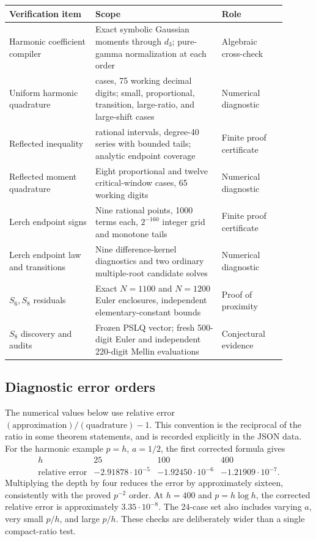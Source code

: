 \begin{center}
\small
\begin{tabular}{>{\raggedright\arraybackslash}p{0.28\linewidth}>{\raggedright\arraybackslash}p{0.41\linewidth}>{\raggedright\arraybackslash}p{0.21\linewidth}}
\toprule
Verification item & Scope & Role\\
\midrule
Harmonic coefficient compiler &
Exact symbolic Gaussian moments through $d_3$; pure-gamma
normalization at each order &
Algebraic cross-check\\[0.35em]
Uniform harmonic quadrature &
24 cases, 75 working decimal digits; small, proportional,
transition, large-ratio, and large-shift cases &
Numerical diagnostic\\[0.35em]
Reflected inequality &
112 rational intervals, degree-40 series with bounded tails;
analytic endpoint coverage &
Finite proof certificate\\[0.35em]
Reflected moment quadrature &
Eight proportional and twelve critical-window cases,
65 working digits &
Numerical diagnostic\\[0.35em]
Lerch endpoint signs &
Nine rational points, 1000 terms each, $2^{-160}$ integer grid
and monotone tails &
Finite proof certificate\\[0.35em]
Lerch endpoint law and transitions &
Nine difference-kernel diagnostics and two ordinary
multiple-root candidate solves &
Numerical diagnostic\\[0.35em]
$S_6,S_8$ residuals &
Exact $N=1100$ and $N=1200$ Euler enclosures,
independent elementary-constant bounds &
Proof of proximity\\[0.35em]
$S_8$ discovery and audits &
Frozen PSLQ vector; fresh 500-digit Euler and independent
220-digit Mellin evaluations &
Conjectural evidence\\
\bottomrule
\end{tabular}
\end{center}

\subsection{Diagnostic error orders}

The numerical values below use relative error
$(\text{approximation})/(\text{quadrature})-1$. This convention is
the reciprocal of the ratio in some theorem statements, and is
recorded explicitly in the JSON data. For the harmonic example
$p=h$, $a=1/2$, the first corrected formula gives
\[
\begin{array}{c|ccc}
h&25&100&400\\ \hline
\text{relative error}
&-2.91878\cdot10^{-5}&-1.92450\cdot10^{-6}&-1.21909\cdot10^{-7}.
\end{array}
\]
Multiplying the depth by four reduces the error by approximately
sixteen, consistently with the proved $p^{-2}$ order.
At $h=400$ and $p=h\log h$, the corrected relative error is
approximately $3.35\cdot10^{-8}$.
The 24-case set also includes varying $a$, very small $p/h$, and
large $p/h$. These checks are deliberately wider than a single
compact-ratio test.

